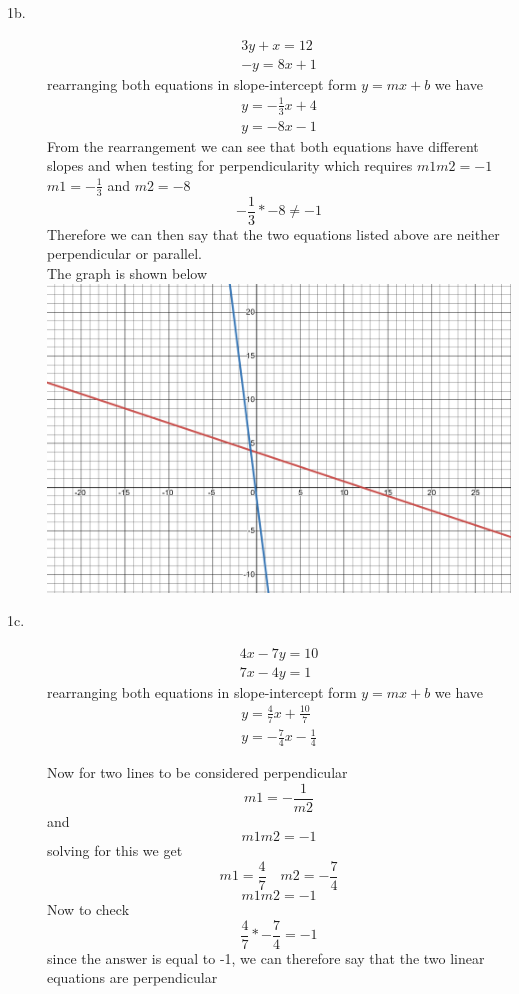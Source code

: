 \documentclass{article}
\begin{document}
\begin{description}
    
    \item [1b.]
    \begin{align*}
        3y+x = 12\\ 
        -y = 8x+1
    \end{align*}
    rearranging both equations in slope-intercept form ${y = mx +b}$ we have
    \begin{align*}
        y = -\frac{1}{3}x + 4\\ 
        y = -8x-1
    \end{align*}
    From the rearrangement we can see that both equations have different slopes and when testing for perpendicularity which requires ${m1m2=-1}$
    ${m1= -\frac{1}{3}}$ and ${m2 = -8}$
    $${-\frac{1}{3}*-8 \neq -1}$$
    Therefore we can then say that the two equations listed above are neither perpendicular or parallel.\\
    
    The graph is shown below\\
    \includegraphics[scale = 0.1]{1b}
    
    
    \item [1c.]
    \begin{align*}
        4x - 7y = 10 \\ 
        7x - 4y = 1
    \end{align*}
    rearranging both equations in slope-intercept form ${y = mx +b}$ we have
    \begin{align*}
        y = \frac{4}{7}x + \frac{10}{7} \\ 
        y = -\frac{7}{4}x - \frac{1}{4}
    \end{align*}
    
    Now for two lines to be considered perpendicular$${m1=-\frac{1}{m2}}$$
    and $${m1m2=-1}$$
    solving for this we get
    $${m1=\frac{4}{7} \quad m2=-\frac{7}{4}}$$
    $${m1m2=-1}$$
    Now to check
    $${\frac{4}{7}*-\frac{7}{4} = -1}$$
    since the answer is equal to -1, we can therefore say that the two linear equations are perpendicular\\
    

\end{description}
\end{document}
